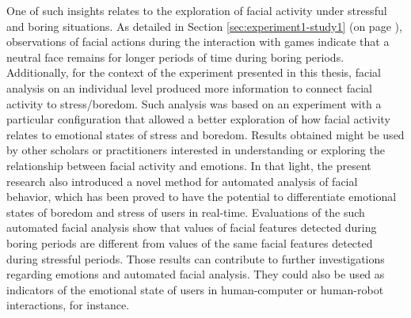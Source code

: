 One of such insights relates to the exploration of facial activity under stressful and boring situations. As detailed in Section \ref{sec:experiment1-study1} (on page \pageref{sec:experiment1-study1}), observations of facial actions during the interaction with games indicate that a neutral face remains for longer periods of time during boring periods. Additionally, for the context of the experiment presented in this thesis, facial analysis on an individual level produced more information to connect facial activity to stress/boredom. Such analysis was based on an experiment with a particular configuration that allowed a better exploration of how facial activity relates to emotional states of stress and boredom. Results obtained might be used by other scholars or practitioners interested in understanding or exploring the relationship between facial activity and emotions. In that light, the present research also introduced a novel method for automated analysis of facial behavior, which has been proved to have the potential to differentiate emotional states of boredom and stress of users in real-time. Evaluations of the such automated facial analysis show that values of facial features detected during boring periods are different from values of the same facial features detected during stressful periods. Those results can contribute to further investigations regarding emotions and automated facial analysis. They could also be used as indicators of the emotional state of users in human-computer or human-robot interactions, for instance.



